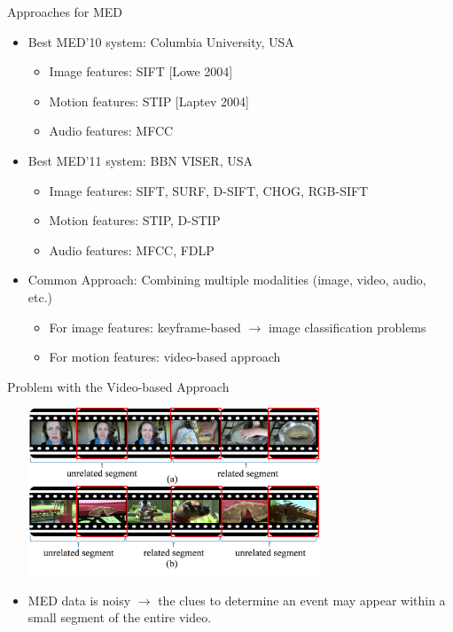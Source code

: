 \documentclass{beamer}
\begin{document}

\begin{frame}[t]{Approaches for MED}
\begin{itemize}
\item Best MED'10 system: Columbia University, USA

\begin{itemize}
\item Image features: SIFT [Lowe 2004]
\item Motion features: STIP [Laptev 2004]
\item Audio features: MFCC
\end{itemize}
\item Best MED'11 system: BBN VISER, USA
\begin{itemize}
\item Image features: SIFT, SURF, D-SIFT, CHOG, RGB-SIFT
\item Motion features: STIP, D-STIP
\item Audio features: MFCC, FDLP
\end{itemize}

\item Common Approach: Combining multiple modalities (image, video, audio, etc.)
\begin{itemize}
\item For image features: keyframe-based $\rightarrow$ image classification problems
\item For motion features: video-based approach
\end{itemize}

\end{itemize}
\end{frame}

\begin{frame}[t]{Problem with the Video-based Approach}
\begin{center}
\includegraphics[width=10cm,height=5cm]{images/challenge4.png}
\end{center}

\begin{itemize}
\item MED data is noisy $\rightarrow$ the clues to determine an event may appear within a small segment of the entire video.

\end{itemize}

\end{frame}
\end{document}
